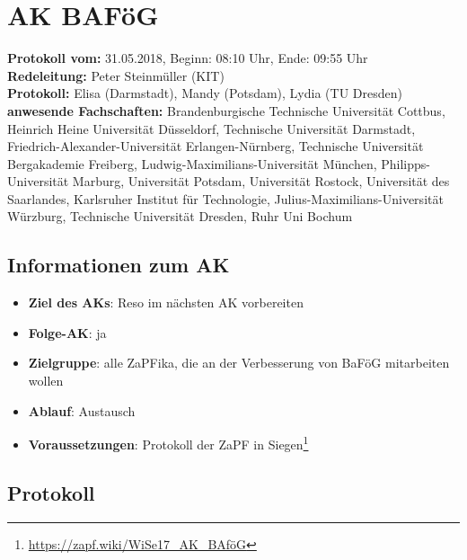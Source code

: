 
\section{AK BAFöG}

  \textbf{Protokoll vom:} 31.05.2018,
  Beginn: 08:10 Uhr,
  Ende: 09:55 Uhr \\
  \textbf{Redeleitung:} Peter Steinmüller (KIT) \\
  \textbf{Protokoll:} Elisa (Darmstadt), Mandy (Potsdam), Lydia (TU Dresden) \\
  \textbf{anwesende Fachschaften:} Brandenburgische Technische Universität Cottbus, Heinrich Heine Universität Düsseldorf, Technische Universität Darmstadt, Friedrich-Alexander-Universität Erlangen-Nürnberg, Technische Universität Bergakademie Freiberg, Ludwig-Maximilians-Universität München, Philipps-Universität Marburg, Universität Potsdam, Universität Rostock, Universität des Saarlandes, Karlsruher Institut für Technologie, Julius-Maximilians-Universität Würzburg, Technische Universität Dresden, Ruhr Uni Bochum

  \subsection*{Informationen zum AK}
    \begin{itemize}
      \item \textbf{Ziel des AKs}: Reso im nächsten AK vorbereiten
      \item \textbf{Folge-AK}: ja
      \item \textbf{Zielgruppe}: alle ZaPFika, die an der Verbesserung von BaFöG mitarbeiten wollen
      \item \textbf{Ablauf}: Austausch
      \item \textbf{Voraussetzungen}: Protokoll der ZaPF in Siegen\footnote{\url{https://zapf.wiki/WiSe17_AK_BAföG}}
    \end{itemize}

  \subsection*{Protokoll}

